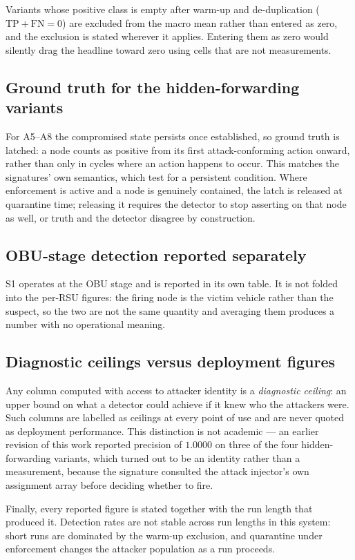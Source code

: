 \documentclass[12pt, a4paper]{report}
\begin{document}
{{Variants whose positive class is empty after warm-up and de-duplication
($\mathrm{TP}+\mathrm{FN}=0$) are excluded from the macro mean rather than
entered as zero, and the exclusion is stated wherever it applies. Entering them
as zero would silently drag the headline toward zero using cells that are not
measurements.

\subsection{Ground truth for the hidden-forwarding variants}
For A5--A8 the compromised state persists once established, so ground truth is
latched: a node counts as positive from its first attack-conforming action
onward, rather than only in cycles where an action happens to occur. This
matches the signatures' own semantics, which test for a persistent condition.
Where enforcement is active and a node is genuinely contained, the latch is
released at quarantine time; releasing it requires the detector to stop
asserting on that node as well, or truth and the detector disagree by
construction.

\subsection{\ac{OBU}-stage detection reported separately}
S1 operates at the \ac{OBU} stage and is reported in its own table. It is not
folded into the per-\ac{RSU} figures: the firing node is the victim vehicle
rather than the suspect, so the two are not the same quantity and averaging them
produces a number with no operational meaning.

\subsection{Diagnostic ceilings versus deployment figures}
Any column computed with access to attacker identity is a \emph{diagnostic
ceiling}: an upper bound on what a detector could achieve if it knew who the
attackers were. Such columns are labelled as ceilings at every point of use and
are never quoted as deployment performance. This distinction is not academic ---
an earlier revision of this work reported precision of $1.0000$ on three of the
four hidden-forwarding variants, which turned out to be an identity rather than
a measurement, because the signature consulted the attack injector's own
assignment array before deciding whether to fire.

Finally, every reported figure is stated together with the run length that
produced it. Detection rates are not stable across run lengths in this system:
short runs are dominated by the warm-up exclusion, and quarantine under
enforcement changes the attacker population as a run proceeds.

}}
\end{document}

